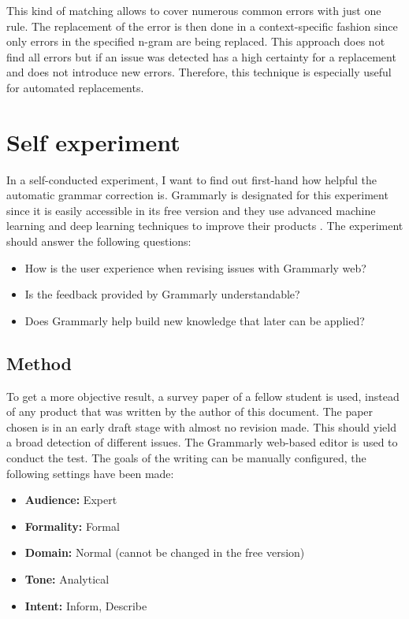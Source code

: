 \documentclass[runningheads]{llncs}
\let\OldTextregistered\textregistered
\renewcommand{\textregistered}{\OldTextregistered\xspace}
\begin{document}
This kind of matching allows to cover numerous common errors with just one rule. The replacement of the error is then done in a context-specific fashion since only errors in the specified n-gram are being replaced. This approach does not find all errors but if an issue was detected has a high certainty for a replacement and does not introduce new errors. Therefore, this technique is especially useful for automated replacements.


\section{Self experiment}
In a self-conducted experiment, I want to find out first-hand how helpful the automatic grammar correction is. Grammarly\textregistered is designated for this experiment since it is easily accessible in its free version and they use advanced machine learning and deep learning techniques to improve their products \citep{noauthor_grammarly_nodate}. The experiment should answer the following questions:

\begin{itemize}
 \item How is the user experience when revising issues with Grammarly\textregistered web?
 \item Is the feedback provided by Grammarly\textregistered understandable?
 \item Does Grammarly\textregistered help build new knowledge that later can be applied?
\end{itemize}


\subsection{Method}
To get a more objective result, a survey paper of a fellow student is used, instead of any product that was written by the author of this document. The paper chosen is in an early draft stage with almost no revision made. This should yield a broad detection of different issues. The Grammarly\textregistered web-based editor is used to conduct the test. The goals of the writing can be manually configured, the following settings have been made:

\begin{itemize}
 \item \textbf{Audience:} Expert
 \item \textbf{Formality:} Formal
 \item \textbf{Domain:} Normal (cannot be changed in the free version)
 \item \textbf{Tone:} Analytical
 \item \textbf{Intent:} Inform, Describe
\end{itemize}
\end{document}
